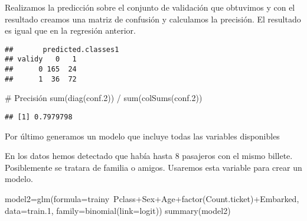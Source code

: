 \documentclass[
]{article}
\newenvironment{Shaded}{\begin{snugshade}}{\end{snugshade}}
\newcommand{\CommentTok}[1]{\textcolor[rgb]{0.50,0.62,0.50}{#1}}
\newcommand{\DataTypeTok}[1]{\textcolor[rgb]{0.87,0.87,0.75}{#1}}
\newcommand{\DecValTok}[1]{\textcolor[rgb]{0.86,0.86,0.80}{#1}}
\newcommand{\FloatTok}[1]{\textcolor[rgb]{0.75,0.75,0.82}{#1}}
\newcommand{\KeywordTok}[1]{\textcolor[rgb]{0.94,0.87,0.69}{#1}}
\newcommand{\NormalTok}[1]{\textcolor[rgb]{0.80,0.80,0.80}{#1}}
\newcommand{\OperatorTok}[1]{\textcolor[rgb]{0.94,0.94,0.82}{#1}}
\newcommand{\StringTok}[1]{\textcolor[rgb]{0.80,0.58,0.58}{#1}}
\begin{document}
Realizamos la predicción sobre el conjunto de validación que obtuvimos y
con el resultado creamos una matriz de confusión y calculamos la
precisión. El resultado es igual que en la regresión anterior.

\begin{Shaded}
\end{Shaded}

\begin{verbatim}
##       predicted.classes1
## validy   0   1
##      0 165  24
##      1  36  72
\end{verbatim}

\begin{Shaded}
\begin{Highlighting}[]
\CommentTok{# Precisión}
\KeywordTok{sum}\NormalTok{(}\KeywordTok{diag}\NormalTok{(conf}\FloatTok{.2}\NormalTok{)) }\OperatorTok{/}\StringTok{ }\KeywordTok{sum}\NormalTok{(}\KeywordTok{colSums}\NormalTok{(conf}\FloatTok{.2}\NormalTok{))}
\end{Highlighting}
\end{Shaded}

\begin{verbatim}
## [1] 0.7979798
\end{verbatim}

Por último generamos un modelo que incluye todas las variables
disponibles

En los datos hemos detectado que había hasta 8 pasajeros con el mismo
billete. Posiblemente se tratara de familia o amigos. Usaremos esta
variable para crear un modelo.

\begin{Shaded}
\begin{Highlighting}[]
\NormalTok{model2=}\KeywordTok{glm}\NormalTok{(}\DataTypeTok{formula=}\NormalTok{trainy}\OperatorTok{~}\NormalTok{Pclass}\OperatorTok{+}\NormalTok{Sex}\OperatorTok{+}\NormalTok{Age}\OperatorTok{+}\KeywordTok{factor}\NormalTok{(Count.ticket)}\OperatorTok{+}\NormalTok{Embarked, }\DataTypeTok{data=}\NormalTok{train}\FloatTok{.1}\NormalTok{, }\DataTypeTok{family=}\KeywordTok{binomial}\NormalTok{(}\DataTypeTok{link=}\NormalTok{logit))}
\KeywordTok{summary}\NormalTok{(model2)}
\end{Highlighting}
\end{Shaded}
\end{document}
